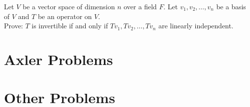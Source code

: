 \documentclass[answers]{exam}
\begin{document}
\begin{questions}
    \question Let $V$ be a vector space of dimension $n$ over a field $F$. Let $v_1,v_2,\dots,v_n$ be a basis of $V$ and $T$ be an operator on $V$. \\
    Prove: $T$ is invertible if and only if $Tv_1,Tv_2,\dots,Tv_n$ are linearly independent.
\end{questions}

\section{Axler Problems}

\section{Other Problems}
\end{document}

